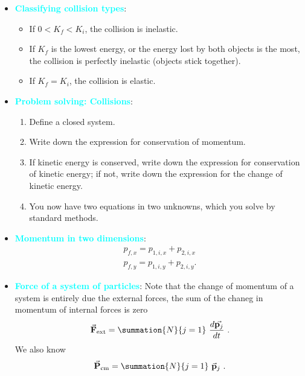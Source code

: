 \documentclass{report}
\begin{document}
\begin{itemize}
        \item \textbf{\textcolor{cyan}{Classifying collision types}}:
            \begin{itemize}
                \item If \(0 < K_f < K_i\), the collision is inelastic.
                \item If \(K_f\) is the lowest energy, or the energy lost by both objects is the most, the collision is perfectly inelastic (objects stick together).
                \item If \(K_f = K_i\), the collision is elastic.
            \end{itemize}
        \item \textbf{\textcolor{cyan}{Problem solving: Collisions}}:
            \begin{enumerate}
                \item Define a closed system.
                \item Write down the expression for conservation of momentum.
                \item If kinetic energy is conserved, write down the expression for conservation of kinetic energy; if not, write down the expression for the change of kinetic energy.
                \item You now have two equations in two unknowns, which you solve by standard methods.
            \end{enumerate}
        \item \textbf{\textcolor{cyan}{Momentum in two dimensions}}:
            \begin{align*}
                p_{f,x} = p_{1,i,x} + p_{2,i,x} \\
                p_{f,y} = p_{1,i,y} + p_{2,i,y}
            .\end{align*}
        \item \textbf{\textcolor{cyan}{Force of a system of particles}}: Note that the change of momentum of a system is entirely due the external forces, the sum of the chaneg in momentum of internal forces is zero
            \begin{align*}
                \vec{\mathbf{F}}_{\text{ext}} = \summation{N}{j=1}\ \frac{d\vec{\mathbf{p}_{j}}}{dt}\
            .\end{align*}
            We also know 
            \begin{align*}
                \vec{\mathbf{P}}_{\text{cm}} = \summation{N}{j=1}\ \vec{\mathbf{p}}_{j}\
            .\end{align*}

\end{itemize}
\end{document}

